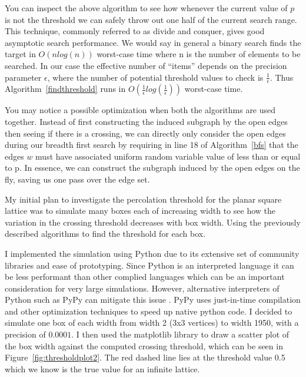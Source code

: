 \documentclass[a4paper,11pt]{article}
\theoremstyle{definition}
\begin{document}
You can inspect the above algorithm to see how whenever the current value of $p$ is not the threshold we can safely throw out one half of the current search range. This technique, commonly referred to as divide and conquer, gives good asymptotic search performance. We would say in general a binary search finds the target in $O(nlog(n))$ worst-case time where n is the number of elements to be searched. In our case the effective number of ``items'' depends on the precision parameter $\epsilon$, where the number of potential threshold values to check is $\frac{1}{\epsilon}$. Thus Algorithm~\ref*{findthreshold} runs in $O(\frac{1}{\epsilon}log(\frac{1}{\epsilon}))$ worst-case time.

You may notice a possible optimization when both the algorithms are used together. Instead of first constructing the induced subgraph by the open edges then seeing if there is a crossing, we can directly only consider the open edges during our breadth first search by requiring in line 18 of Algorithm~\ref*{bfs} that the edges $w$ must have associated uniform random variable value of less than or equal to p. In essence, we can construct the subgraph induced by the open edges on the fly, saving us one pass over the edge set. 

My initial plan to investigate the percolation threshold for the planar square lattice was to simulate many boxes each of increasing width to see how the variation in the crossing threshold decreases with box width. Using the previously described algorithms to find the threshold for each box.

I implemented the simulation using Python due to its extensive set of community libraries and ease of prototyping. Since Python is an interpreted language it can be less performant than other complied languages which can be an important consideration for very large simulations. However, alternative interpreters  of Python such as PyPy can mitigate this issue \cite{PyPy}. PyPy uses just-in-time compilation and other optimization techniques to speed up native python code.
I decided to simulate one box of each width from width 2 (3x3 vertices) to width 1950, with a precision of $0.0001$. I then used the matplotlib library to draw a scatter plot of the box width against the computed crossing threshold, which can be seen in Figure~\ref*{fig:thresholdplot2}. The red dashed line lies at the threshold value 0.5 which we know is the true value for an infinite lattice.
\end{document}
